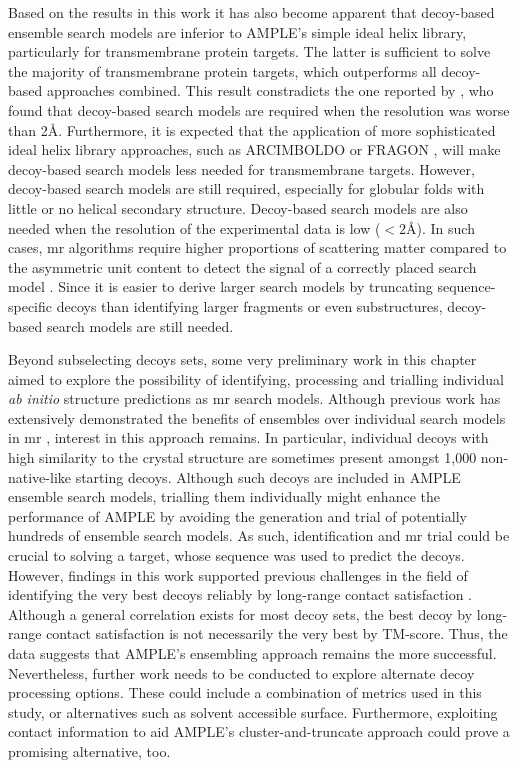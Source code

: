 Based on the results in this work it has also become apparent that decoy-based ensemble search models are inferior to AMPLE's simple ideal helix library, particularly for transmembrane protein targets. The latter is sufficient to solve the majority of transmembrane protein targets, which outperforms all decoy-based approaches combined. This result constradicts the one reported by \textcite{Thomas2017-sh}, who found that decoy-based search models are required when the resolution was worse than 2\AA. Furthermore, it is expected that the application of more sophisticated ideal helix library approaches, such as ARCIMBOLDO \cite{Millan2015-uf} or FRAGON \cite{Jenkins2018-gf}, will make decoy-based search models less needed for transmembrane targets. However, decoy-based search models are still required, especially for globular folds with little or no helical secondary structure. Decoy-based search models are also needed when the resolution of the experimental data is low ($<2$\AA). In such cases, \gls{mr} algorithms require higher proportions of scattering matter compared to the asymmetric unit content to detect the signal of a correctly placed search model \cite{McCoy2017-cz}. Since it is easier to derive larger search models by truncating sequence-specific decoys than identifying larger fragments or even substructures, decoy-based search models are still needed.

Beyond subselecting decoys sets, some very preliminary work in this chapter aimed to explore the possibility of identifying, processing and trialling individual \textit{ab initio} structure predictions as \gls{mr} search models. Although previous work has extensively demonstrated the benefits of ensembles over individual search models in \gls{mr} \cite{Rigden2018-zt,Keegan2018-kn,Thomas2015-wu}, interest in this approach remains. In particular, individual decoys with high similarity to the crystal structure are sometimes present amongst 1,000 non-native-like starting decoys. Although such decoys are included in AMPLE ensemble search models, trialling them individually might enhance the performance of AMPLE by avoiding the generation and trial of potentially hundreds of ensemble search models. As such, identification and \gls{mr} trial could be crucial to solving a target, whose sequence was used to predict the decoys. However, findings in this work supported previous challenges in the field of identifying the very best decoys reliably by long-range contact satisfaction \cite{Adhikari2018-lj,De_Oliveira2017-gj,Kosciolek2014-bt}. Although a general correlation exists for most decoy sets, the best decoy by long-range contact satisfaction is not necessarily the very best by TM-score. Thus, the data suggests that AMPLE's ensembling approach remains the more successful. Nevertheless, further work needs to be conducted to explore alternate decoy processing options. These could include a combination of metrics used in this study, or alternatives such as solvent accessible surface. Furthermore, exploiting contact information to aid AMPLE's cluster-and-truncate approach could prove a promising alternative, too.
